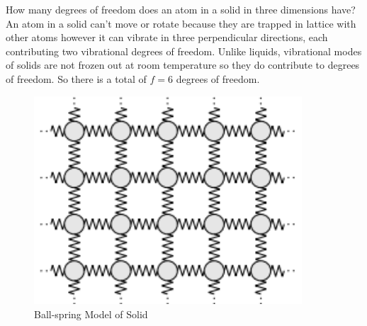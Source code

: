 \documentclass[12pt, a4paper]{article}
\newcounter{exa}
\begin{document}
\begin{texample}
How many degrees of freedom does an atom in a solid in three dimensions have? \\

An atom in a solid can't move or rotate because they are trapped in lattice with other atoms however it can vibrate in three perpendicular directions, each contributing two vibrational degrees of freedom. Unlike liquids, vibrational modes of solids are not frozen out at room temperature so they do contribute to degrees of freedom. So there is a total of $f=6$ degrees of freedom.

\begin{figure}[H]
\centering
\includegraphics[width=100mm]{20.png}
\caption{Ball-spring Model of Solid}
\end{figure}
\end{texample}
\end{document}
